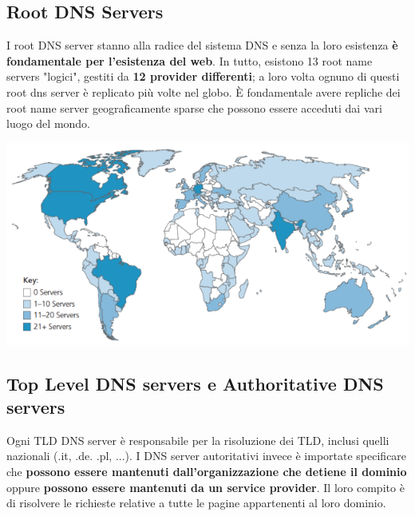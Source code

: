 \documentclass[12pt]{article}
\begin{document}
\subsection{Root DNS Servers}
I root DNS server stanno alla radice del sistema DNS e senza la loro esistenza \textbf{è fondamentale per l'esistenza del web}.
In tutto, esistono 13 root name servers "logici", gestiti da \textbf{12 provider differenti}; a loro volta ognuno di questi root dns server è replicato
più volte nel globo. È fondamentale avere repliche dei root name server geograficamente sparse che possono essere acceduti dai vari luogo del mondo.
\begin{center}
    \includegraphics[width = 0.70\linewidth]{Images/33.png}
\end{center}
\subsection{Top Level DNS servers e Authoritative DNS servers}
Ogni TLD DNS server è responsabile per la risoluzione dei TLD, inclusi quelli nazionali (.it, .de. .pl, ...).
I DNS server autoritativi invece è importate specificare che \textbf{possono essere mantenuti dall'organizzazione che detiene il dominio}
oppure \textbf{possono essere mantenuti da un service provider}. Il loro compito è di risolvere le richieste relative a tutte le pagine appartenenti
al loro dominio.
\end{document}
